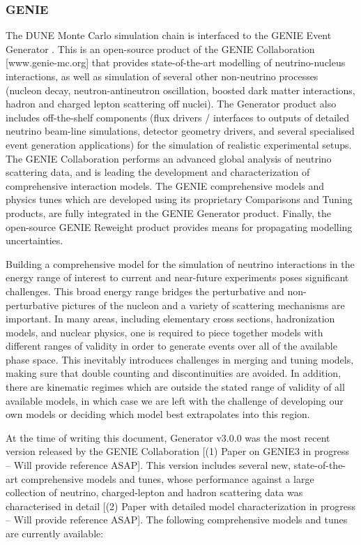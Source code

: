 \subsubsection{GENIE}

The DUNE Monte Carlo simulation chain is interfaced to the GENIE Event Generator \cite{Andreopoulos:2009rq}. This is an open-source product of the GENIE Collaboration [www.genie-mc.org] that provides state-of-the-art modelling of neutrino-nucleus interactions, as well as simulation of several other non-neutrino processes (nucleon decay, neutron-antineutron oscillation, boosted dark matter interactions, hadron and charged lepton scattering off nuclei). The Generator product also includes off-the-shelf components (flux drivers / interfaces to outputs of detailed neutrino beam-line simulations, detector geometry drivers, and several specialised event generation applications) for the simulation of realistic experimental setups. The GENIE Collaboration performs an advanced global analysis of neutrino scattering data, and is leading the development and characterization of comprehensive interaction models. The GENIE comprehensive models and physics tunes which are developed using its proprietary Comparisons and Tuning products, are fully integrated in the GENIE Generator product. Finally, the open-source GENIE Reweight product provides means for propagating modelling uncertainties. 

Building a comprehensive model for the simulation of neutrino interactions in the energy range of interest to current and near-future experiments poses significant challenges. This broad energy range bridges the perturbative and non-perturbative pictures of the nucleon and a variety of scattering mechanisms are important. In many areas, including elementary cross sections, hadronization models, and nuclear physics, one is required to piece together models with different ranges of validity in order to generate events over all of the available phase space. This inevitably introduces challenges in merging and tuning models, making sure that double counting and discontinuities are avoided. In addition, there are kinematic regimes which are outside the stated range of validity of all available models, in which case we are left with the challenge of developing our own models or deciding which model best extrapolates into this region. 

At the time of writing this document, Generator v3.0.0 was the most recent version released by the GENIE Collaboration [(1) Paper on GENIE3 in progress -- Will provide reference ASAP]. This version includes several new, state-of-the-art comprehensive models and tunes, whose performance against a large collection of neutrino, charged-lepton and hadron scattering data was characterised in detail [(2) Paper with detailed model characterization in progress -- Will provide reference ASAP]. The following comprehensive models and tunes are currently available:

